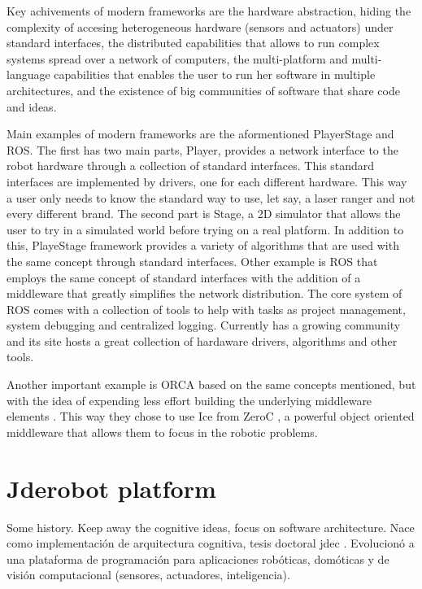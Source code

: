 \documentclass[twocolumn]{svjour3}          %
\begin{document}
Key achivements of modern frameworks are the hardware abstraction, hiding the complexity of accesing heterogeneous hardware (sensors and
actuators) under standard interfaces, the distributed capabilities
that allows to run complex systems spread over a network of computers,
the multi-platform and multi-language capabilities that enables the
user to run her software in multiple architectures, and the existence
of big communities of software that share code and ideas.

Main examples of modern frameworks are the aformentioned PlayerStage
and ROS. The first has two main parts, Player, provides a network
interface to the robot hardware through a collection of standard
interfaces. This standard interfaces are implemented by drivers, one
for each different hardware. This way a user only needs to know the
standard way to use, let say, a laser ranger and not every different
brand. The second part is Stage, a 2D simulator that allows the user
to try in a simulated world before trying on a real platform. In
addition to this, PlayeStage framework provides a variety of
algorithms that are used with the same concept through standard
interfaces. Other example is ROS that employs the same concept of
standard interfaces with the addition of a middleware that greatly
simplifies the network distribution. The core system of ROS comes with
a collection of tools to help with tasks as project management, system
debugging and centralized logging. Currently has a growing community
and its site hosts a great collection of hardaware drivers, algorithms
and other tools.

Another important example is ORCA \cite{brooks05,brooks07} based on the
same concepts mentioned, but with the idea of expending less effort
building the underlying middleware elements . This way they chose to
use Ice from ZeroC \cite{henning04}, a powerful object oriented middleware
that allows them to focus in the robotic problems.


\section{Jderobot platform}
\label{sec:jderobot}

Some history. Keep away the cognitive ideas, focus on software
architecture. Nace como implementación de arquitectura cognitiva,
tesis doctoral jdec \cite{canas02}. Evolucionó a una plataforma de programación para
aplicaciones robóticas, domóticas y de visión computacional (sensores,
actuadores, inteligencia).
\end{document}
